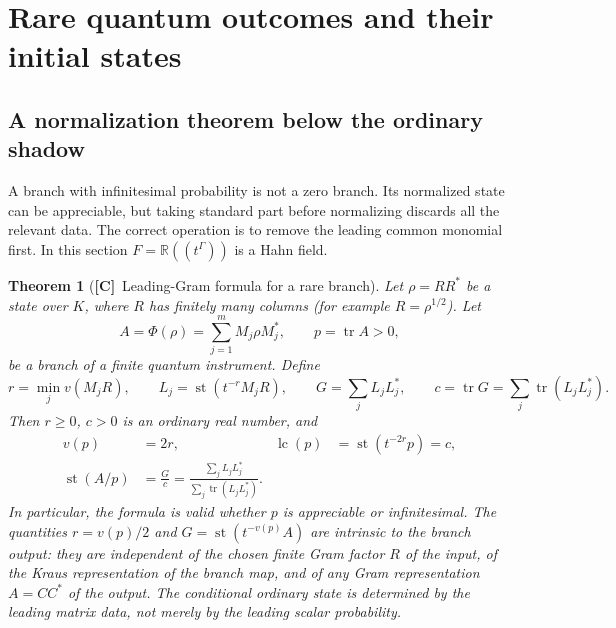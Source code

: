 \documentclass[11pt,oneside]{article}
\numberwithin{equation}{section}
\theoremstyle{plain}
\newtheorem{theorem}{Theorem}[section]
\theoremstyle{definition}
\theoremstyle{remark}
\newcommand{\R}{\mathbb R}
\DeclareMathOperator{\st}{st}
\DeclareMathOperator{\tr}{tr}
\DeclareMathOperator{\lc}{lc}
\newcommand{\TC}{\textcolor{TierC}{\textsf{\bfseries[C]}}}
\begin{document}
\section{Rare quantum outcomes and their initial states}\label{qgs:sec:rare}

\subsection{A normalization theorem below the ordinary shadow}
A branch with infinitesimal probability is not a zero branch. Its normalized state can be appreciable, but taking standard part before normalizing discards all the relevant data. The correct operation is to remove the leading common monomial first. In this section $F=\R((t^\Gamma))$ is a Hahn field.

\begin{theorem}[\TC\ Leading-Gram formula for a rare branch]\label{qgs:thm:rare}
Let $\rho=RR^*$ be a state over $K$, where $R$ has finitely many columns (for example $R=\rho^{1/2}$). Let
\[
 A=\Phi(\rho)=\sum_{j=1}^{m}M_j\rho M_j^*,\qquad p=\tr A>0,
\]
be a branch of a finite quantum instrument. Define
\begin{equation}\label{qgs:eq:rare-initial}
 r=\min_jv(M_jR),\qquad
 L_j=\st(t^{-r}M_jR),\qquad
 G=\sum_jL_jL_j^*,\qquad
 c=\tr G=\sum_j\tr(L_jL_j^*).
\end{equation}
Then $r\ge0$, $c>0$ is an ordinary real number, and
\begin{align}
 v(p)&=2r, & \lc(p)&=\st(t^{-2r}p)=c,\label{qgs:eq:rare-prob}\\
 \st(A/p)&=\frac{G}{c}=\frac{\sum_jL_jL_j^*}{\sum_j\tr(L_jL_j^*)}.\label{qgs:eq:rare-state}
\end{align}
In particular, the formula is valid whether $p$ is appreciable or infinitesimal. The quantities $r=v(p)/2$ and $G=\st(t^{-v(p)}A)$ are intrinsic to the branch output: they are independent of the chosen finite Gram factor $R$ of the input, of the Kraus representation of the branch map, and of any Gram representation $A=CC^*$ of the output. The conditional ordinary state is determined by the leading \emph{matrix} data, not merely by the leading scalar probability.
\end{theorem}
\end{document}
